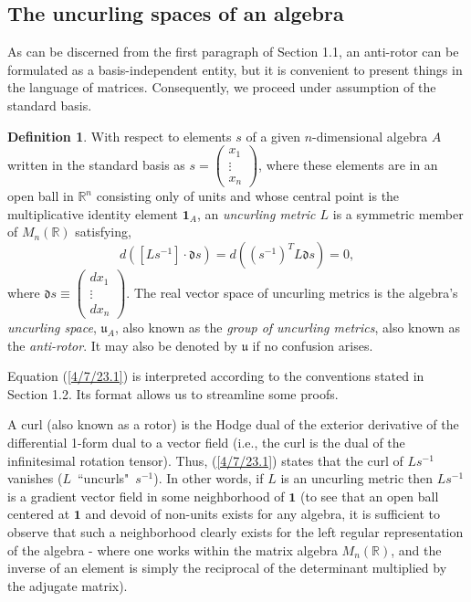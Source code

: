 \documentclass{amsart}
\numberwithin{equation}{section}
\theoremstyle{definition}
\newtheorem{definition}[theorem]{Definition}
\numberwithin{theorem}{section}
\begin{document}
      \subsection{The uncurling spaces of an algebra} As can be discerned from the first paragraph of Section 1.1, an anti-rotor can be formulated as a basis-independent entity, but it is convenient to present things in the language of matrices.  Consequently, we proceed under assumption of the standard basis.     
       
   \enlargethispage{1.5cm}
     \begin{definition}\label{7/21/23.1} With respect to elements $s$ of a given $n$-dimensional algebra $A$ written in the standard basis as $s= \left(\begin{array}{ccc}
x_1   \\ 
\vdots \\
x_n   
\end{array}\right)$, where these elements are in an open ball in $\mathbb{R}^n$ consisting only of units and whose central point is the multiplicative identity element $\mathbf{1}_A$, an {\it uncurling metric $L$} is a symmetric member of $M_n(\mathbb{R})$  satisfying, \begin{equation}\label{4/7/23.1} d([Ls^{-1}]\cdot \mathfrak{d}s) = d\left((s^{-1})^T L \mathfrak{d}s\right) = 0, \end{equation} where $\mathfrak{d}s \equiv \left(\begin{array}{ccc}
dx_1   \\ 
\vdots \\
dx_n   
\end{array}\right)$.  The real vector space of uncurling metrics is the algebra's {\it uncurling space}, $\mathfrak{u}_A$, also known as the {\it group of uncurling metrics}, also known as the {\it anti-rotor}.  It may also be denoted by $\mathfrak{u}$ if no confusion arises.    \end{definition}

\bigskip

Equation (\ref{4/7/23.1}) is interpreted according to the conventions stated in Section 1.2.  Its format allows us to streamline some proofs.

 A curl (also known as a rotor) is the Hodge dual of the exterior derivative of the differential \mbox{1-form} dual to a vector field (i.e., the curl is the dual of the infinitesimal rotation tensor).  Thus,  (\ref{4/7/23.1}) states that the curl of $Ls^{-1}$ vanishes (\mbox{$L$ ``uncurls" $s^{-1}$}).    In other words, if $L$ is an uncurling metric then $Ls^{-1}$ is a gradient vector field in some neighborhood of $\mathbf{1}$ (to see that an open ball centered at $\mathbf{1}$ and devoid of non-units exists for any algebra, it is sufficient to observe that such a neighborhood clearly exists for the left regular representation of the algebra - where one works within the matrix algebra $ M_n(\mathbb{R})$, and the inverse of an element is simply the reciprocal of the determinant multiplied by the adjugate matrix).
 
\end{document}
